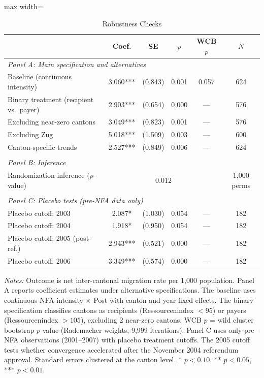 \begin{table}[H]
\centering
\caption{Robustness Checks}
\begin{threeparttable}
\begin{adjustbox}{max width=\textwidth}
\small
\begin{tabular}{lccccc}
\toprule
 & Coef. & SE & $p$ & WCB $p$ & $N$ \\
\midrule
\multicolumn{6}{l}{\textit{Panel A: Main specification and alternatives}} \\
Baseline (continuous intensity) & 3.060*** & (0.843) & 0.001 & 0.057 & 624 \\
Binary treatment (recipient vs.~payer) & 2.903*** & (0.654) & 0.000 & --- & 576 \\
Excluding near-zero cantons & 3.049*** & (0.823) & 0.001 & --- & 576 \\
Excluding Zug & 5.018*** & (1.509) & 0.003 & --- & 600 \\
Canton-specific trends & 2.527*** & (0.849) & 0.006 & --- & 624 \\
 \\
\multicolumn{6}{l}{\textit{Panel B: Inference}} \\
Randomization inference ($p$-value) & \multicolumn{4}{c}{0.012} & 1,000 perms \\
 \\
\multicolumn{6}{l}{\textit{Panel C: Placebo tests (pre-NFA data only)}} \\
Placebo cutoff: 2003 & 2.087* & (1.030) & 0.054 & --- & 182 \\
Placebo cutoff: 2004 & 1.918* & (0.950) & 0.054 & --- & 182 \\
Placebo cutoff: 2005 (post-ref.) & 2.943*** & (0.521) & 0.000 & --- & 182 \\
Placebo cutoff: 2006 & 3.349*** & (0.574) & 0.000 & --- & 182 \\
\bottomrule
\end{tabular}
\end{adjustbox}
\begin{tablenotes}[flushleft]
\small
\item \textit{Notes:} Outcome is net inter-cantonal migration rate per 1,000 population. Panel A reports coefficient estimates under alternative specifications. The baseline uses continuous NFA intensity $\times$ Post with canton and year fixed effects. The binary specification classifies cantons as recipients (Ressourcenindex $< 95$) or payers (Ressourcenindex $> 105$), excluding 2 near-zero cantons. WCB $p$ = wild cluster bootstrap $p$-value (Rademacher weights, 9,999 iterations). Panel C uses only pre-NFA observations (2001--2007) with placebo treatment cutoffs. The 2005 cutoff tests whether convergence accelerated after the November 2004 referendum approval. Standard errors clustered at the canton level. * $p<0.10$, ** $p<0.05$, *** $p<0.01$.
\end{tablenotes}
\end{threeparttable}
\label{tab:robustness}
\end{table}

